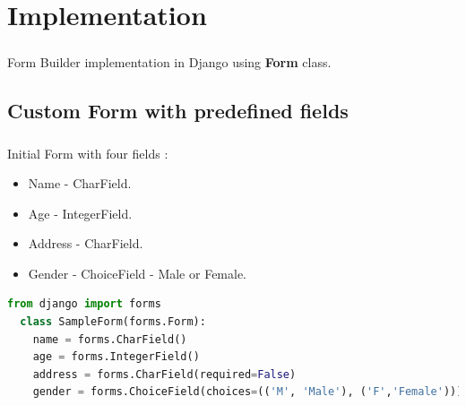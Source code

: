 \chapter{Implementation}
\paragraph{}Form Builder implementation in Django using \textbf{Form} class.
\section{Custom Form with predefined fields}
\paragraph{}

Initial Form with four fields :
\begin{itemize}
	\item Name - CharField.
	\item Age - IntegerField.
	\item Address - CharField.
	\item Gender - ChoiceField - Male or Female.
\end{itemize}
\begin{lstlisting}[language=python,numbers=none]
  from django import forms
  class SampleForm(forms.Form):
  	name = forms.CharField()
  	age = forms.IntegerField()
  	address = forms.CharField(required=False)
  	gender = forms.ChoiceField(choices=(('M', 'Male'), ('F','Female')))
\end{lstlisting}
\begin{center}
\end{center}


